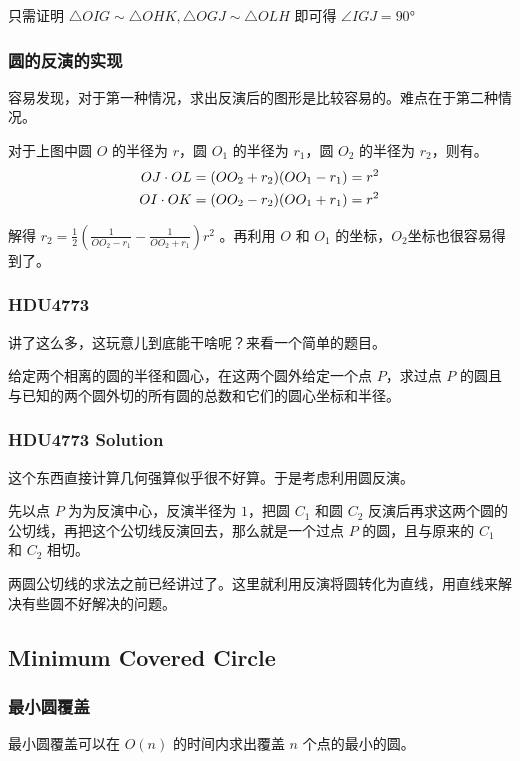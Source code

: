 \documentclass[10pt]{beamer}
\begin{document}
\begin{CJK}{UTF8}{gkai}
\begin{spacing}{1.2}
\begin{frame}
			只需证明 $\triangle OIG \sim \triangle OHK,\triangle OGJ \sim \triangle OLH$ 即可得 $\angle IGJ = 90$°

		\end{frame}
		\begin{frame}
			\frametitle{圆的反演的实现}

			容易发现，对于第一种情况，求出反演后的图形是比较容易的。难点在于第二种情况。 \pause

			对于上图中圆 $O$ 的半径为 $r$，圆 $O_1$ 的半径为 $r_1$，圆 $O_2$ 的半径为 $r_2$，则有。
			\begin{align}
				OJ \cdot OL = (OO_2 + r_2)(OO_1 - r_1) = r^2 \notag \\
				OI \cdot OK = (OO_2 - r_2)(OO_1 + r_1) = r^2 \notag
			\end{align}

			解得 $r_2 = \frac{1}{2}(\frac{1}{OO_2 - r_1} - \frac{1}{OO_2 + r_1}) r^2$ \pause 。再利用 $O$ 和 $O_1$ 的坐标，$O_2$坐标也很容易得到了。
		\end{frame}
		\begin{frame}
			\frametitle{HDU4773}

			讲了这么多，这玩意儿到底能干啥呢？来看一个简单的题目。 \pause

			给定两个相离的圆的半径和圆心，在这两个圆外给定一个点 $P$，求过点 $P$ 的圆且与已知的两个圆外切的所有圆的总数和它们的圆心坐标和半径。

		\end{frame}
		\begin{frame}
			\frametitle{HDU4773 Solution}

			这个东西直接计算几何强算似乎很不好算。于是考虑利用圆反演。 \pause

			先以点 $P$ 为为反演中心，反演半径为 $1$，把圆 $C_1$ 和圆 $C_2$ 反演后再求这两个圆的公切线，再把这个公切线反演回去，那么就是一个过点 $P$ 的圆，且与原来的 $C_1$ 和 $C_2$ 相切。 \pause

			两圆公切线的求法之前已经讲过了。这里就利用反演将圆转化为直线，用直线来解决有些圆不好解决的问题。

		\end{frame}

		\subsection{Minimum Covered Circle}
		\begin{frame}
			\frametitle{最小圆覆盖}

			最小圆覆盖可以在 $O(n)$ 的时间内求出覆盖 $n$ 个点的最小的圆。 \pause


\end{frame}
\end{spacing}
\end{CJK}
\end{document}
